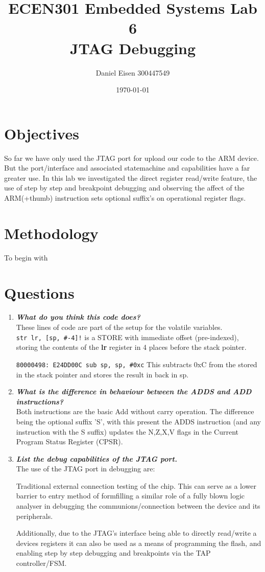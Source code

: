 \documentclass[11pt]{article}
\title{ECEN301 Embedded Systems Lab 6 \\ JTAG Debugging}
\author{Daniel Eisen 300447549}
\date{\today}
\begin{document}
\begin{preview}
\maketitle
\section{Objectives}
So far we have only used the JTAG port for upload our code to the ARM device. But the port/interface and associated statemachine and capabilities have a far greater use. In this lab we investigated the direct register read/write feature, the use of step by step and breakpoint debugging and observing the affect of the ARM(+thumb) instruction sets optional suffix's on operational register flags. 
\section{Methodology}
To begin with 
\section{Questions}
\begin{enumerate}
    \item \textbf{\textit{What do you think this code does?}}\\
    These lines of code are part of the setup for the volatile variables.\\
    \texttt{str lr, [sp, \#-4]!} is a STORE with immediate offset (pre-indexed), storing the contents of the \textbf{lr} register in 4 places before the stack pointer.

    \texttt{80000498: E24DD00C sub sp, sp, \#0xc} This subtracts 0xC from the stored in the stack pointer and stores the result in back in sp.
    \item \textbf{\textit{What is the difference in behaviour between the ADDS and ADD instructions?}}\\
    Both instructions are the basic Add without carry operation. The difference being the optional suffix 'S', with this present the ADDS instruction (and any instruction with the S suffix) updates the N,Z,X,V flags in the Current Program Status Register (CPSR).
    \item \textbf{\textit{List the debug capabilities of the JTAG port.}}\\
    The use of the JTAG port in debugging are: 
    
    Traditional external connection testing of the chip. This can serve as a lower barrier to entry method of formfilling a similar role of a fully blown logic analyser in debugging the communions/connection between the device and its peripherals.

    Additionally, due to the JTAG's interface being able to directly read/write a devices registers it can also be used as a means of programming the flash, and enabling step by step debugging and breakpoints via the TAP controller/FSM.
\end{enumerate}
\end{preview}
\end{document}
